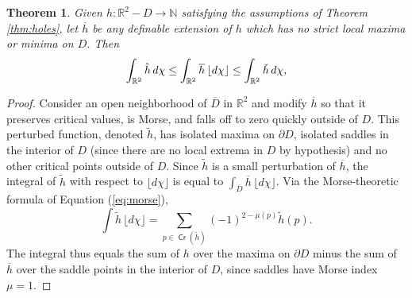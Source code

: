 \documentclass{psapm-l}
\newtheorem{theorem}{Theorem}[section]
\theoremstyle{definition}
\theoremstyle{remark}
\numberwithin{equation}{section}
\begin{document}
\begin{theorem}
\label{thm:harmonic}
Given $h\colon{{\mathbb R}}^2-D\to{{\mathbb N}}$ satisfying the assumptions of Theorem \ref{thm:holes}, let $\overline{h}$ be any definable extension of $h$ which has no strict local maxima or minima on $D$. Then
\begin{equation}
    \int_{{{\mathbb R}}^2} \hat{h}\, d\chi
    \leq
    \int_{{{\mathbb R}}^2} \overline{h}\,{{\lfloor d\chi\rfloor}}
    \leq
    \int_{{{\mathbb R}}^2} {\rlap{\smash{\raisebox{2.25ex}{{\raisebox{1ex}{\rotatebox{180}{{$\hat{~}\,$}}}}}}}{h}}\, d\chi ,
\end{equation}
\end{theorem}
\begin{proof}
Consider an open neighborhood of $\overline{D}$ in ${{\mathbb R}}^2$ and modify $\overline{h}$ so that it preserves critical values, is Morse, and falls off to zero quickly outside of $D$. This perturbed function, denoted $\widetilde{h}$, has isolated maxima on $\partial D$, isolated saddles in the interior of $D$ (since there are no local extrema in $D$ by hypothesis) and no other critical points outside of $D$. Since $\widetilde{h}$ is a small perturbation of $\overline{h}$, the integral of $\widetilde{h}$ with respect to ${{\lfloor d\chi\rfloor}}$ is equal to $\int_{\overline{D}}\overline{h}\,{{\lfloor d\chi\rfloor}}$. Via the Morse-theoretic formula of Equation (\ref{eq:morse}),
\[
    \int \widetilde{h}\,{{\lfloor d\chi\rfloor}}
    =
    \sum_{p\in{{{\operatorname{\mathsf{{Cr}}}}}}(\widetilde{h})} (-1)^{2-\mu(p)}\widetilde{h}(p) .
\]
The integral thus equals the sum of $h$ over the maxima on $\partial D$ minus the sum of $\overline{h}$ over the saddle points in the interior of $D$, since saddles have Morse index $\mu=1$.


\end{proof}
\end{document}
